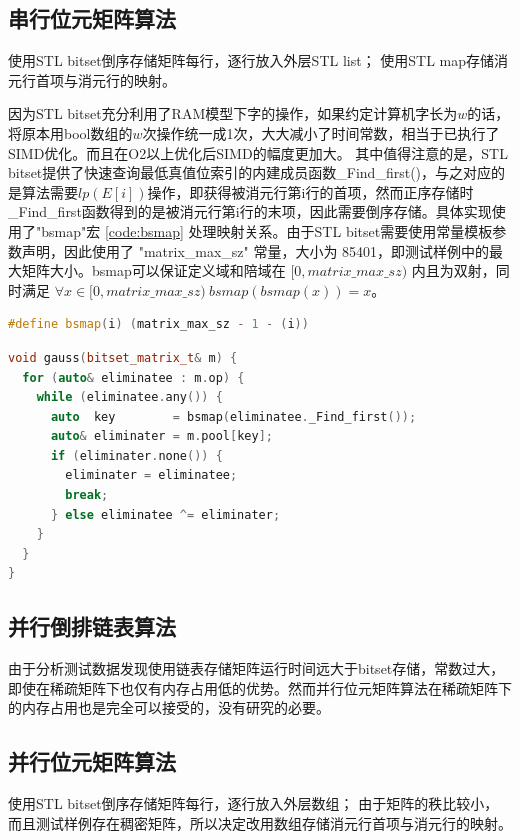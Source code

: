 \documentclass[a4paper]{article}
\begin{document}
\subsection{串行位元矩阵算法}
使用STL bitset倒序存储矩阵每行，逐行放入外层STL list；
使用STL map存储消元行首项与消元行的映射。

因为STL bitset充分利用了RAM模型下字的操作，如果约定计算机字长为$w$的话，将原本用bool数组的$w$次操作统一成1次，大大减小了时间常数，相当于已执行了SIMD优化。而且在O2以上优化后SIMD的幅度更加大。
其中值得注意的是，STL bitset提供了快速查询最低真值位索引的内建成员函数\_Find\_first()，与之对应的是算法需要$lp(E[i])$操作，即获得被消元行第i行的首项，然而正序存储时\_Find\_first函数得到的是被消元行第i行的末项，因此需要倒序存储。具体实现使用了"bsmap"宏 \ref{code:bsmap} 处理映射关系。由于STL bitset需要使用常量模板参数声明，因此使用了 "matrix\_max\_sz" 常量，大小为 85401，即测试样例中的最大矩阵大小。bsmap可以保证定义域和陪域在 $[0, matrix\_max\_sz)$ 内且为双射，同时满足 $\forall{x \in [0, matrix\_max\_sz)}\ bsmap(bsmap(x)) = x$。
\begin{lstlisting}[frame=trbl, language={C++}, caption={bsmap 宏}, label = {code:bsmap}]
#define bsmap(i) (matrix_max_sz - 1 - (i))
\end{lstlisting}

\begin{lstlisting}[frame=trbl, language={C++}, caption={串行位元矩阵消元部分}]
void gauss(bitset_matrix_t& m) {
  for (auto& eliminatee : m.op) {
    while (eliminatee.any()) {
      auto  key        = bsmap(eliminatee._Find_first());
      auto& eliminater = m.pool[key];
      if (eliminater.none()) {
        eliminater = eliminatee;
        break;
      } else eliminatee ^= eliminater;
    }
  }
}
\end{lstlisting}

\subsection{并行倒排链表算法}
由于分析测试数据发现使用链表存储矩阵运行时间远大于bitset存储，常数过大，即使在稀疏矩阵下也仅有内存占用低的优势。然而并行位元矩阵算法在稀疏矩阵下的内存占用也是完全可以接受的，没有研究的必要。

\subsection{并行位元矩阵算法}
使用STL bitset倒序存储矩阵每行，逐行放入外层数组；
由于矩阵的秩比较小，而且测试样例存在稠密矩阵，所以决定改用数组存储消元行首项与消元行的映射。
\end{document}
